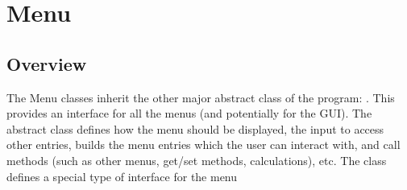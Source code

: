 \documentclass[../Documentation.tex]{subfiles}
\begin{document}
\section{Menu}
\subsection{Overview}
The Menu classes inherit the other major abstract class of the program: . This provides an interface for all the menus (and potentially for the GUI). The abstract class defines how the menu should be displayed, the input to access other entries, builds the menu entries which the user can interact with, and call methods (such as other menus, get/set methods, calculations), etc.
The  class defines a special type of interface for the menu 
\end{document}
